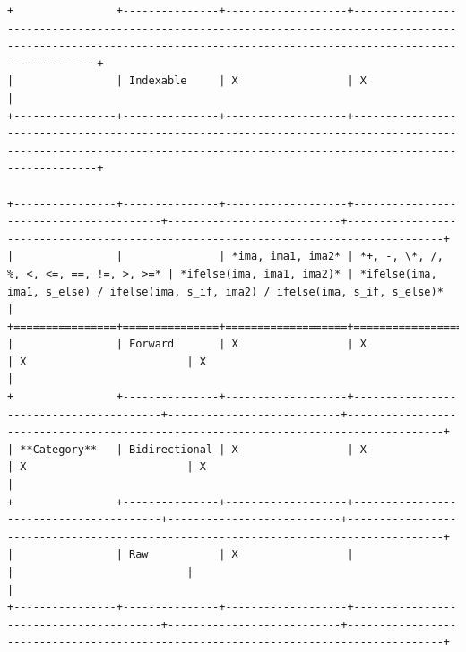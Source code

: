 \begin{verbatim}
+                +---------------+-------------------+--------------------------------------------------------------------------------------------------------------------------------------------------------------------------+
|                | Indexable     | X                 | X                                                                                                                                                                        |
+----------------+---------------+-------------------+--------------------------------------------------------------------------------------------------------------------------------------------------------------------------+

+----------------+---------------+-------------------+----------------------------------------+---------------------------+-------------------------------------------------------------------------------------+
|                |               | *ima, ima1, ima2* | *+, -, \*, /, %, <, <=, ==, !=, >, >=* | *ifelse(ima, ima1, ima2)* | *ifelse(ima, ima1, s_else) / ifelse(ima, s_if, ima2) / ifelse(ima, s_if, s_else)*   |
+================+===============+===================+========================================+===========================+=====================================================================================+
|                | Forward       | X                 | X                                      | X                         | X                                                                                   |
+                +---------------+-------------------+----------------------------------------+---------------------------+-------------------------------------------------------------------------------------+
| **Category**   | Bidirectional | X                 | X                                      | X                         | X                                                                                   |
+                +---------------+-------------------+----------------------------------------+---------------------------+-------------------------------------------------------------------------------------+
|                | Raw           | X                 |                                        |                           |                                                                                     |
+----------------+---------------+-------------------+----------------------------------------+---------------------------+-------------------------------------------------------------------------------------+

\end{verbatim}
